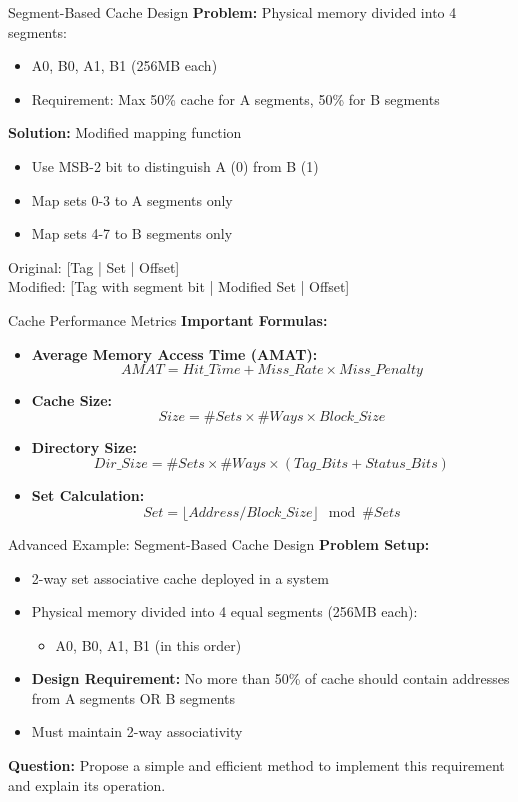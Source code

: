 \documentclass[aspectratio=169,12pt]{beamer}
\begin{document}
\begin{frame}{Segment-Based Cache Design}
\textbf{Problem:} Physical memory divided into 4 segments:
\begin{itemize}
    \item A0, B0, A1, B1 (256MB each)
    \item Requirement: Max 50\% cache for A segments, 50\% for B segments
\end{itemize}

\textbf{Solution:} Modified mapping function
\begin{itemize}
    \item Use MSB-2 bit to distinguish A (0) from B (1)
    \item Map sets 0-3 to A segments only
    \item Map sets 4-7 to B segments only
\end{itemize}

Original: [Tag | Set | Offset]\\
Modified: [Tag with segment bit | Modified Set | Offset]
\end{frame}

\begin{frame}{Cache Performance Metrics}
\textbf{Important Formulas:}

\begin{itemize}
    \item \textbf{Average Memory Access Time (AMAT):}
    $$AMAT = Hit\_Time + Miss\_Rate \times Miss\_Penalty$$
    
    \item \textbf{Cache Size:}
    $$Size = \#Sets \times \#Ways \times Block\_Size$$
    
    \item \textbf{Directory Size:}
    $$Dir\_Size = \#Sets \times \#Ways \times (Tag\_Bits + Status\_Bits)$$
    
    \item \textbf{Set Calculation:}
    $$Set = \lfloor Address / Block\_Size \rfloor \mod \#Sets$$
\end{itemize}
\end{frame}

\begin{frame}{Advanced Example: Segment-Based Cache Design}
\textbf{Problem Setup:}
\begin{itemize}
    \item 2-way set associative cache deployed in a system
    \item Physical memory divided into 4 equal segments (256MB each):
    \begin{itemize}
        \item A0, B0, A1, B1 (in this order)
    \end{itemize}
    \item \textbf{Design Requirement:} No more than 50\% of cache should contain addresses from A segments OR B segments
    \item Must maintain 2-way associativity
\end{itemize}

\textbf{Question:} Propose a simple and efficient method to implement this requirement and explain its operation.
\end{frame}
\end{document}
